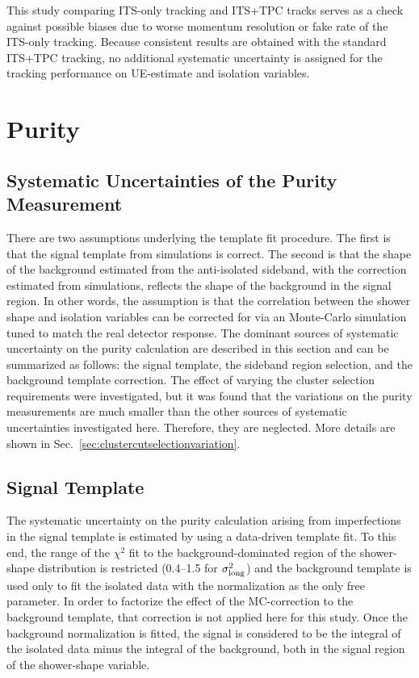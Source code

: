 This study comparing ITS-only tracking and ITS+TPC tracks serves as a check against possible biases due to worse momentum resolution or fake rate of the ITS-only tracking. Because consistent results are obtained with the standard ITS+TPC tracking, no additional systematic uncertainty is assigned for the tracking performance on UE-estimate and isolation variables. 



\section{Purity}
\subsection{Systematic Uncertainties of the Purity Measurement}
\label{sec:puritysystematics}
There are two assumptions underlying the template fit procedure. The first is that the signal template from simulations is correct. The second is that the shape of the background estimated from the anti-isolated sideband, with the correction estimated from simulations, reflects the shape of the background in the signal region. In other words, the assumption is that the correlation between the shower shape and isolation variables can be corrected for via an Monte-Carlo simulation tuned to match the real detector response. The dominant sources of systematic uncertainty on the purity calculation are described in this section and can be summarized as follows: the signal template, the sideband region selection, and the background template correction. The effect of varying the cluster selection requirements were investigated, but it was found that the variations on the purity measurements are much smaller than the other sources of systematic uncertainties investigated here. Therefore, they are neglected. More details are shown in Sec.~\ref{sec:clustercutselectionvariation}. 

\subsection{Signal Template}
The systematic uncertainty on the purity calculation arising from imperfections in the signal template is estimated by using a data-driven template fit. To this end, the range of the $\chi^{2}$ fit to the background-dominated region of the shower-shape distribution is restricted (0.4--1.5 for $\sigma^{2}_{\mathrm{long}}$) and the background template is used only to fit the isolated data with the normalization as the only free parameter. In order to factorize the effect of the MC-correction to the background template, that correction is not applied here for this study. Once the background normalization is fitted, the signal is considered to be the integral of the isolated data minus the integral of the background, both in the signal region of the shower-shape variable. 

